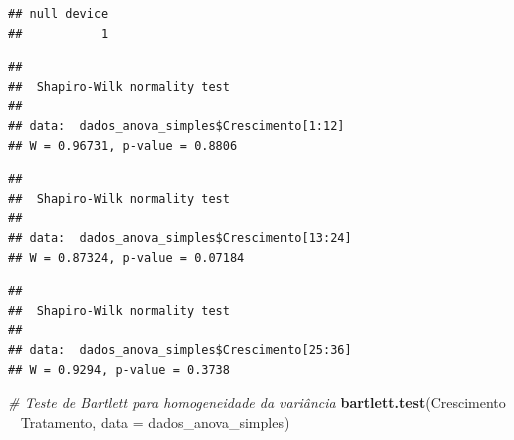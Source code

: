 \documentclass[
]{book}
\newenvironment{Shaded}{\begin{snugshade}}{\end{snugshade}}
\newcommand{\CommentTok}[1]{\textcolor[rgb]{0.56,0.35,0.01}{\textit{#1}}}
\newcommand{\DataTypeTok}[1]{\textcolor[rgb]{0.13,0.29,0.53}{#1}}
\newcommand{\DecValTok}[1]{\textcolor[rgb]{0.00,0.00,0.81}{#1}}
\newcommand{\KeywordTok}[1]{\textcolor[rgb]{0.13,0.29,0.53}{\textbf{#1}}}
\newcommand{\NormalTok}[1]{#1}
\newcommand{\OperatorTok}[1]{\textcolor[rgb]{0.81,0.36,0.00}{\textbf{#1}}}
\newcommand{\StringTok}[1]{\textcolor[rgb]{0.31,0.60,0.02}{#1}}
\begin{document}
\begin{verbatim}
## null device 
##           1
\end{verbatim}

\begin{Shaded}
\end{Shaded}

\begin{verbatim}
## 
## 	Shapiro-Wilk normality test
## 
## data:  dados_anova_simples$Crescimento[1:12]
## W = 0.96731, p-value = 0.8806
\end{verbatim}

\begin{Shaded}
\end{Shaded}

\begin{verbatim}
## 
## 	Shapiro-Wilk normality test
## 
## data:  dados_anova_simples$Crescimento[13:24]
## W = 0.87324, p-value = 0.07184
\end{verbatim}

\begin{Shaded}
\end{Shaded}

\begin{verbatim}
## 
## 	Shapiro-Wilk normality test
## 
## data:  dados_anova_simples$Crescimento[25:36]
## W = 0.9294, p-value = 0.3738
\end{verbatim}

\begin{Shaded}
\begin{Highlighting}[]
\CommentTok{# Teste de Bartlett para homogeneidade da variância}
\KeywordTok{bartlett.test}\NormalTok{(Crescimento }\OperatorTok{~}\StringTok{ }\NormalTok{Tratamento, }\DataTypeTok{data =}\NormalTok{ dados_anova_simples)}
\end{Highlighting}
\end{Shaded}
\end{document}
